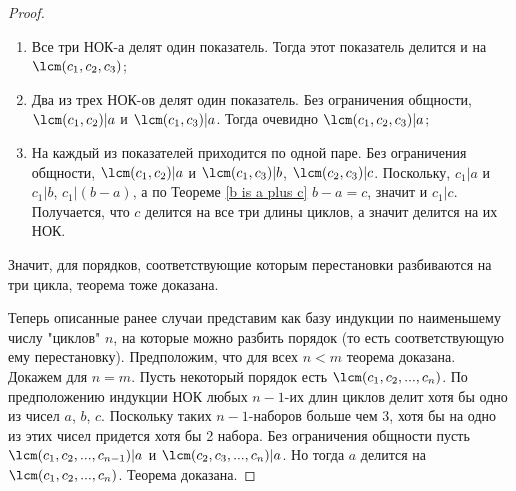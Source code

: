 \begin{proof}
		\begin{enumerate}
			\item Все три НОК-а делят один показатель. Тогда этот показатель делится и на $\lcm(c_1, c_2, c_3)$;
			\item Два из трех НОК-ов делят один показатель. Без ограничения общности, $\lcm(c_1, c_2) | a$ и $\lcm(c_1, c_3) | a$. Тогда очевидно $\lcm(c_1, c_2, c_3) | a$;
			\item На каждый из показателей приходится по одной паре. Без ограничения общности, $\lcm(c_1, c_2) | a$ и $\lcm(c_1, c_3) | b$, $\lcm(c_2, c_3) | c$. Поскольку, $c_1 | a$ и $c_1 | b$, $c_1 | (b-a)$, а по Теореме \ref{b is a plus c} $b-a = c$, значит и $c_1 | c$. Получается, что $c$ делится на все три длины циклов, а значит делится на их НОК. 
		\end{enumerate}
		Значит, для порядков, соответствующие которым перестановки разбиваются на три цикла, теорема тоже доказана.
		
		Теперь описанные ранее случаи представим как базу индукции по наименьшему числу "циклов" $n$, на которые можно разбить порядок (то есть соответствующую ему перестановку).
		Предположим, что для всех  $n < m$ теорема доказана. Докажем для $n=m$. Пусть некоторый порядок есть $\lcm(c_1, c_2, ..., c_n)$. По предположению индукции НОК любых $n-1$-их длин циклов делит хотя бы одно из чисел $a$, $b$, $c$. Поскольку таких $n-1$-наборов больше чем 3, хотя бы на одно из этих чисел придется хотя бы 2 набора. Без ограничения общности пусть $\lcm(c_1, c_2, ..., c_{n-1}) | a$ и $\lcm(c_2, c_3, ..., c_n) | a$. Но тогда $a$ делится на $\lcm(c_1, c_2, ..., c_n)$. Теорема доказана.
	\end{proof}